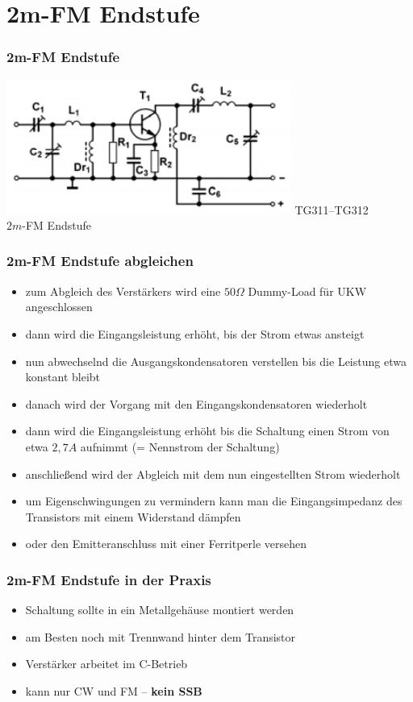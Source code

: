 \section*{2m-FM Endstufe}
\begin{frame}
  \frametitle{2m-FM Endstufe}
    \begin{center}
        \includegraphics[width=0.7\textwidth,height=.7\textheight,keepaspectratio]{a17/TG311.png}
        {\tiny TG311--TG312 \hyperlink{refs}{\cite{bna}}}\\
        $2m$-FM Endstufe
    \end{center}
\end{frame}
\begin{frame}
\frametitle{2m-FM Endstufe abgleichen}
\begin{itemize}
  \item zum Abgleich des Verstärkers wird eine $50 \Omega$ Dummy-Load für UKW angeschlossen
  \item dann wird die Eingangsleistung erhöht, bis der Strom etwas ansteigt
  \item nun abwechselnd die Ausgangskondensatoren verstellen bis die Leistung etwa konstant bleibt
  \item danach wird der Vorgang mit den Eingangskondensatoren wiederholt
  \item dann wird die Eingangsleistung erhöht bis die Schaltung einen Strom von etwa $2,7 A$ aufnimmt (= Nennstrom der Schaltung)
  \item anschließend wird der Abgleich mit dem nun eingestellten Strom wiederholt
  \item um Eigenschwingungen zu vermindern kann man die Eingangsimpedanz des Transistors mit einem Widerstand dämpfen
  \item oder den Emitteranschluss mit einer Ferritperle versehen
\end{itemize}
\end{frame}

\begin{frame}
\frametitle{2m-FM Endstufe in der Praxis}
\begin{itemize}
  \item Schaltung sollte in ein Metallgehäuse montiert werden
  \item am Besten noch mit Trennwand hinter dem Transistor
  \item Verstärker arbeitet im C-Betrieb
  \item kann nur CW und FM -- \textbf{kein SSB}
\end{itemize}
\end{frame}

